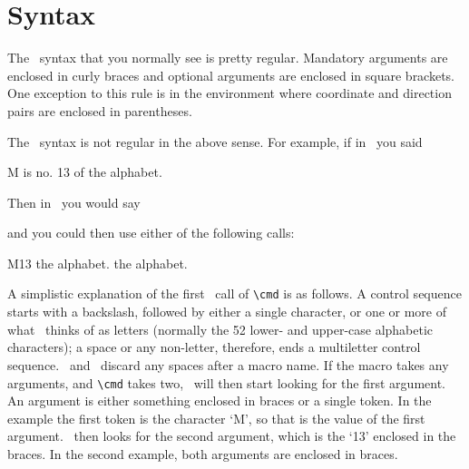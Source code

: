 


\section{Syntax}

    The \ltx\ syntax that you normally see is pretty regular. 
Mandatory arguments are enclosed in curly braces and optional
arguments are enclosed in square brackets. One exception to this
rule is in the  environment where coordinate and direction
pairs are enclosed in parentheses.

    The \tx\ syntax is not regular in the above sense. For example, if in
\ltx\ you said
\begin{lcode}
\newcommand*{\cmd}[2]{#1 is no. #2 of}
\cmd{M}{13} the alphabet. %
\end{lcode}
Then in \tx\ you would say
\begin{lcode}
\def\cmd#1#2{#1 is no. #2 of}
\end{lcode}
and you could then use either of the following calls:
\begin{lcode}
\cmd M{13} the alphabet.  %
 the alphabet. %
\end{lcode}

     A simplistic explanation of the first \tx\ call of \verb?\cmd? is as 
follows. A control sequence starts with a backslash, followed by either
a single character, or one or more of what \tx\ thinks of as letters
(normally the 52 lower- and upper-case alphabetic characters);
a space or any non-letter, therefore, ends a multiletter control
sequence. \tx\ and \ltx\ discard any spaces after a macro name. 
If the macro takes any arguments, and \verb?\cmd? takes two, \tx\ will
then start looking for the first argument. An argument is either
something enclosed in braces or a single token. In the example the first
token is the character `M', so that is the value of the first argument.
\tx\ then looks for the second argument, which is the `13' enclosed
in the braces. In the second example, both arguments are enclosed in braces.


